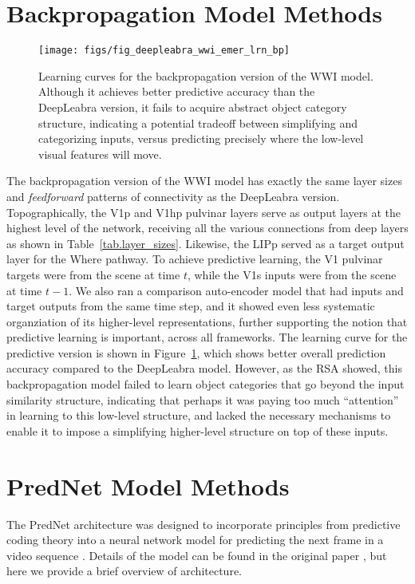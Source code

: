 \documentclass[12pt,twoside]{article}
\newif\myifpdf
\begin{document}
\section{Backpropagation Model Methods}

\begin{figure}
  \centering\texttt{[image: figs/fig\_deepleabra\_wwi\_emer\_lrn\_bp]}
  \caption{Learning curves for the backpropagation version of the WWI model.  Although it achieves better predictive accuracy than the DeepLeabra version, it fails to acquire abstract object category structure, indicating a potential tradeoff between simplifying and categorizing inputs, versus predicting precisely where the low-level visual features will move.}
  \label{fig.bp_lrn}
\end{figure}

The backpropagation version of the WWI model has exactly the same layer sizes and {\em feedforward} patterns of connectivity as the DeepLeabra version.  Topographically, the V1p and V1hp pulvinar layers serve as output layers at the highest level of the network, receiving all the various connections from deep layers as shown in Table~\ref{tab.layer_sizes}.  Likewise, the LIPp served as a target output layer for the Where pathway.  To achieve predictive learning, the V1 pulvinar targets were from the scene at time $t$, while the V1s inputs were from the scene at time $t-1$.  We also ran a comparison auto-encoder model that had inputs and target outputs from the same time step, and it showed even less systematic organziation of its higher-level representations, further supporting the notion that predictive learning is important, across all frameworks.  The learning curve for the predictive version is shown in Figure~\ref{fig.bp_lrn}, which shows better overall prediction accuracy compared to the DeepLeabra model.  However, as the RSA showed, this backpropagation model failed to learn object categories that go beyond the input similarity structure, indicating that perhaps it was paying too much ``attention'' in learning to this low-level structure, and lacked the necessary mechanisms to enable it to impose a simplifying higher-level structure on top of these inputs.

\section{PredNet Model Methods}

The PredNet architecture was designed to incorporate principles from predictive coding theory into a neural network model for predicting the next frame in a video sequence \cite{LotterKreimanCox16}. Details of the model can be found in the original paper \cite{LotterKreimanCox16}, but here we provide a brief overview of architecture. 
\end{document}
